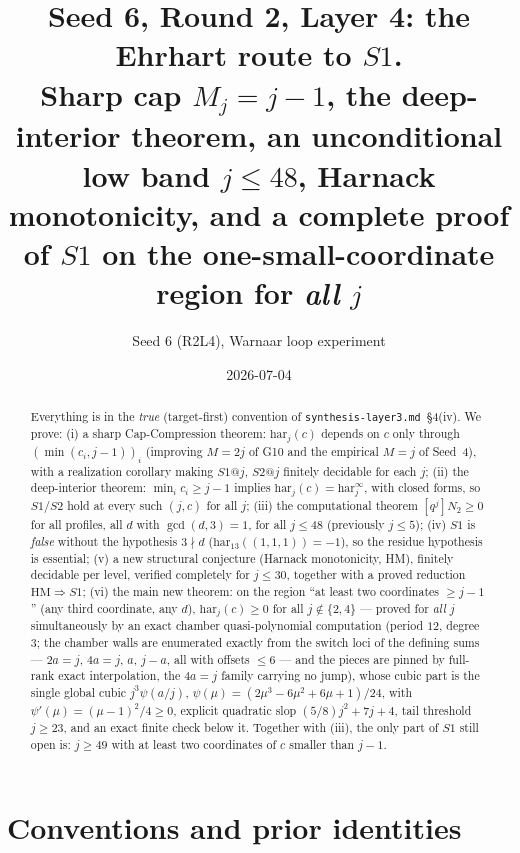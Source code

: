 \documentclass[11pt]{article}
\title{Seed 6, Round 2, Layer 4: the Ehrhart route to $S1$.\\
Sharp cap $M_j=j-1$, the deep-interior theorem, an unconditional low band
$j\le 48$, Harnack monotonicity, and a complete proof of $S1$ on the
one-small-coordinate region for \emph{all} $j$}
\author{Seed 6 (R2L4), Warnaar loop experiment}
\date{2026-07-04}
\theoremstyle{definition}
\theoremstyle{remark}
\newcommand{\har}{\mathrm{har}}
\newcommand{\haru}{\har^{\infty}}
\begin{document}
\maketitle

\begin{abstract}
Everything is in the \emph{true} (target-first) convention of
\texttt{synthesis-layer3.md}~\S4(iv). We prove: (i) a sharp Cap-Compression
theorem: $\har_j(c)$ depends on $c$ only through $(\min(c_i,j-1))_i$
(improving $M=2j$ of G10 and the empirical $M=j$ of Seed~4), with a
realization corollary making $S1@j$, $S2@j$ finitely decidable for each $j$;
(ii) the deep-interior theorem: $\min_i c_i\ge j-1$ implies
$\har_j(c)=\haru_j$, with closed forms, so $S1$/$S2$ hold at every such
$(j,c)$ for all $j$; (iii) the computational theorem $[q^j]N_2\ge 0$ for all
profiles, all $d$ with $\gcd(d,3)=1$, for all $j\le 48$ (previously $j\le5$);
(iv) $S1$ is \emph{false} without the hypothesis $3\nmid d$
($\har_{13}((1,1,1))=-1$), so the residue hypothesis is essential;
(v) a new structural conjecture (Harnack monotonicity, HM), finitely
decidable per level, verified completely for $j\le 30$, together with a
proved reduction $\mathrm{HM}\Rightarrow S1$;
(vi) the main new theorem: on the region ``at least two coordinates
$\ge j-1$'' (any third coordinate, any $d$), $\har_j(c)\ge 0$ for all
$j\notin\{2,4\}$ --- proved for \emph{all} $j$ simultaneously by an exact
chamber quasi-polynomial computation (period $12$, degree $3$; the chamber
walls are enumerated exactly from the switch loci of the defining sums ---
$2a=j$, $4a=j$, $a$, $j-a$, all with offsets $\le6$ --- and the pieces are
pinned by full-rank exact interpolation, the $4a=j$ family carrying no
jump), whose cubic part is the single
global cubic $j^3\psi(a/j)$, $\psi(\mu)=(2\mu^3-6\mu^2+6\mu+1)/24$, with
$\psi'(\mu)=(\mu-1)^2/4\ge0$, explicit quadratic slop $(5/8)j^2+7j+4$, tail
threshold $j\ge 23$, and an exact finite check below it.
Together with (iii), the only part of $S1$ still open is: $j\ge 49$ with at
least two coordinates of $c$ smaller than $j-1$.
\end{abstract}

\section{Conventions and prior identities}\label{sec:conv}
\end{document}
